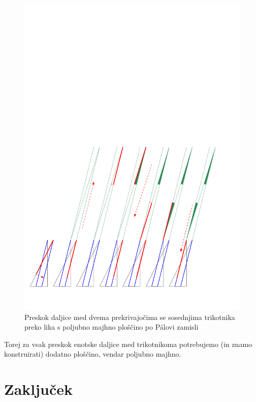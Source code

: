 \documentclass[a4paper, 12pt]{article}
\begin{document}
\begin{figure}[h!]
    \centering
    \includegraphics[width=\textwidth]{ipe_slike/pal.pdf}
    \caption{Preskok daljice med dvema prekrivajočima se sosednjima trikotnika preko lika s poljubno majhno ploščino po Pálovi zamisli}
    \label{pal}
\end{figure}

Torej za vsak preskok enotske daljice med trikotnikoma potrebujemo (in znamo konstruirati) dodatno ploščino, vendar poljubno majhno.







\section*{Zaključek}


\printbibliography[heading=bibintoc, title={Literatura}]

\end{document}
